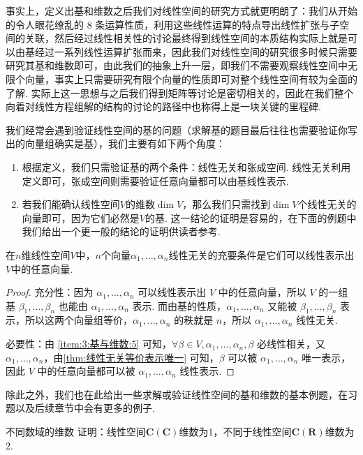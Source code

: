 事实上，定义出基和维数之后我们对线性空间的研究方式就更明朗了：我们从开始的令人眼花缭乱的 8 条运算性质，利用这些线性运算的特点导出线性扩张与子空间的关联，然后经过线性相关性的讨论最终得到线性空间的本质结构实际上就是可以由基经过一系列线性运算扩张而来，因此我们对线性空间的研究很多时候只需要研究其基和维数即可，由此我们的抽象上升一层，即我们不需要观察线性空间中无限个向量，事实上只需要研究有限个向量的性质即可对整个线性空间有较为全面的了解. 实际上这一思想与之后我们得到矩阵等讨论是密切相关的，因此在我们整个向着对线性方程组解的结构的讨论的路径中也称得上是一块关键的里程碑.

我们经常会遇到验证线性空间的基的问题（求解基的题目最后往往也需要验证你写出的向量组确实是基），我们主要有如下两个角度：
\begin{enumerate}
    \item 根据定义，我们只需验证基的两个条件：线性无关和张成空间. 线性无关利用定义即可，张成空间则需要验证任意向量都可以由基线性表示.

    \item 若我们能确认线性空间$V$的维数$\dim V$，那么我们只需找到$\dim V$个线性无关的向量即可，因为它们必然是$V$的基. 这一结论的证明是容易的，在下面的例题中我们给出一个更一般的结论的证明供读者参考.
\end{enumerate}

\begin{example}{}{}
    在$n$维线性空间$V$中，$n$个向量$\alpha_1,\ldots,\alpha_n$线性无关的充要条件是它们可以线性表示出$V$中的任意向量.
\end{example}

\begin{proof}
    充分性：因为 $\alpha_1,\ldots,\alpha_n$ 可以线性表示出 $V$ 中的任意向量，所以 $V$ 的一组基 $\beta_1, \ldots, \beta_n$ 也能由 $\alpha_1,\ldots,\alpha_n$ 表示. 而由基的性质，$\alpha_1,\ldots,\alpha_n$ 又能被 $\beta_1, \ldots, \beta_n$ 表示，所以这两个向量组等价，$\alpha_1,\ldots,\alpha_n$ 的秩就是 $n$，所以 $\alpha_1,\ldots,\alpha_n$ 线性无关.

    必要性：由 \ref*{item:3:基与维数:5} 可知，$\forall \beta \in V, \alpha_1, \ldots, \alpha_n, \beta$ 必线性相关，又 $\alpha_1,\ldots,\alpha_n$，由\autoref{thm:线性无关等价表示唯一} 可知，$\beta$ 可以被 $\alpha_1,\ldots,\alpha_n$ 唯一表示，因此 $V$ 中的任意向量都可以被 $\alpha_1,\ldots,\alpha_n$ 线性表示.
\end{proof}

除此之外，我们也在此给出一些求解或验证线性空间的基和维数的基本例题，在习题以及后续章节中会有更多的例子.
\begin{example}{}{不同数域的维数}
    证明：线性空间$\mathbf{C}(\mathbf{C})$维数为1，不同于线性空间$\mathbf{C}(\mathbf{R})$维数为2.
\end{example}

